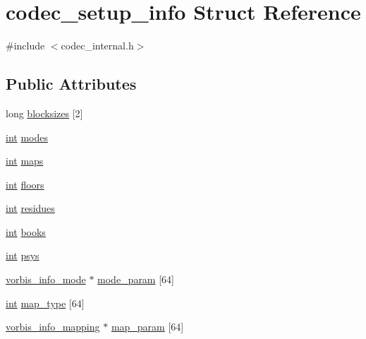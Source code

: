 \hypertarget{structcodec__setup__info}{}\section{codec\+\_\+setup\+\_\+info Struct Reference}
\label{structcodec__setup__info}


{\ttfamily \#include $<$codec\+\_\+internal.\+h$>$}

\subsection*{Public Attributes}
\begin{DoxyCompactItemize}
\item 
long \hyperlink{structcodec__setup__info_a8b08129139f671b7bbd9573aa2576fe9}{blocksizes} \mbox{[}2\mbox{]}
\item 
\hyperlink{xmltok_8h_a5a0d4a5641ce434f1d23533f2b2e6653}{int} \hyperlink{structcodec__setup__info_a922009abe4668e454cc238a6c27b337d}{modes}
\item 
\hyperlink{xmltok_8h_a5a0d4a5641ce434f1d23533f2b2e6653}{int} \hyperlink{structcodec__setup__info_a0631814413bb5e4cad9d6c34abea2d25}{maps}
\item 
\hyperlink{xmltok_8h_a5a0d4a5641ce434f1d23533f2b2e6653}{int} \hyperlink{structcodec__setup__info_a07326866bbd3e16ba395995c47f1afe5}{floors}
\item 
\hyperlink{xmltok_8h_a5a0d4a5641ce434f1d23533f2b2e6653}{int} \hyperlink{structcodec__setup__info_af730d6d8181fb830badaf26b6b688afb}{residues}
\item 
\hyperlink{xmltok_8h_a5a0d4a5641ce434f1d23533f2b2e6653}{int} \hyperlink{structcodec__setup__info_a2a1ae7d41f735899ade353d16b5163d1}{books}
\item 
\hyperlink{xmltok_8h_a5a0d4a5641ce434f1d23533f2b2e6653}{int} \hyperlink{structcodec__setup__info_a0ff85713fe3d4d57b0fe0acd86764e6e}{psys}
\item 
\hyperlink{structvorbis__info__mode}{vorbis\+\_\+info\+\_\+mode} $\ast$ \hyperlink{structcodec__setup__info_a40fc25e41a2e10422b5004f322d1d110}{mode\+\_\+param} \mbox{[}64\mbox{]}
\item 
\hyperlink{xmltok_8h_a5a0d4a5641ce434f1d23533f2b2e6653}{int} \hyperlink{structcodec__setup__info_aa186f9b80f56c5b09a68598da505b5e2}{map\+\_\+type} \mbox{[}64\mbox{]}
\item 
\hyperlink{codec__internal_8h_ac950fba32fc1ede78f8bb7b83796969e}{vorbis\+\_\+info\+\_\+mapping} $\ast$ \hyperlink{structcodec__setup__info_ac1ba2acf8ad63b29d8889920c43d2549}{map\+\_\+param} \mbox{[}64\mbox{]}

\end{DoxyCompactItemize}
